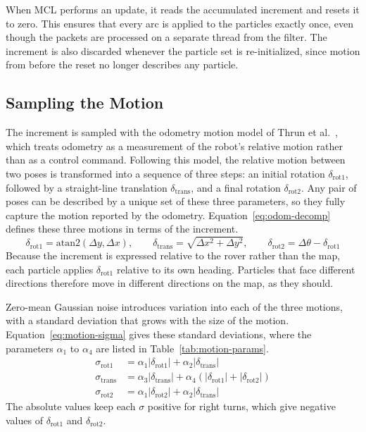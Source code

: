 When MCL performs an update, it reads the accumulated increment and resets it to zero. 
This ensures that every arc is applied to the particles exactly once,
even though the packets are processed on a separate thread from the filter. The increment is
also discarded whenever the particle set is re-initialized, since motion from before the
reset no longer describes any particle.

\subsection{Sampling the Motion}
\label{sec:odom-sampling}
The increment is sampled with the odometry motion model of Thrun et
al.~\cite{thrun2005probabilistic}, which treats odometry as a measurement of the robot's
relative motion rather than as a control command. Following this model, the relative motion
between two poses is transformed into a sequence of three steps: an initial rotation
$\delta_{\mathrm{rot1}}$, followed by a straight-line translation $\delta_{\mathrm{trans}}$,
and a final rotation $\delta_{\mathrm{rot2}}$. Any pair of poses can be described by a unique
set of these three parameters, so they fully capture the motion reported by the odometry.
Equation~\ref{eq:odom-decomp} defines these three motions in terms of the increment.
\begin{equation}
  \label{eq:odom-decomp}
  \delta_{\mathrm{rot1}} = \mathrm{atan2}(\Delta y, \Delta x), \qquad
  \delta_{\mathrm{trans}} = \sqrt{\Delta x^2 + \Delta y^2}, \qquad
  \delta_{\mathrm{rot2}} = \Delta\theta - \delta_{\mathrm{rot1}}
\end{equation}
Because the increment is expressed relative to the rover rather than the map, each particle
applies $\delta_{\mathrm{rot1}}$ relative to its own heading. Particles that face different
directions therefore move in different directions on the map, as they should.

Zero-mean Gaussian noise introduces variation into each of the three motions, with a standard
deviation that grows with the size of the motion. Equation~\ref{eq:motion-sigma} gives these standard
deviations, where the parameters $\alpha_1$ to $\alpha_4$ are listed in
Table~\ref{tab:motion-params}.
\begin{equation}
  \label{eq:motion-sigma}
  \begin{aligned}
    \sigma_{\mathrm{rot1}}  &= \alpha_1 |\delta_{\mathrm{rot1}}| + \alpha_2 |\delta_{\mathrm{trans}}| \\
    \sigma_{\mathrm{trans}} &= \alpha_3 |\delta_{\mathrm{trans}}| + \alpha_4 \left( |\delta_{\mathrm{rot1}}| + |\delta_{\mathrm{rot2}}| \right) \\
    \sigma_{\mathrm{rot2}}  &= \alpha_1 |\delta_{\mathrm{rot2}}| + \alpha_2 |\delta_{\mathrm{trans}}|
  \end{aligned}
\end{equation}
The absolute values keep each $\sigma$ positive for right turns, which give negative values of
$\delta_{\mathrm{rot1}}$ and $\delta_{\mathrm{rot2}}$.

